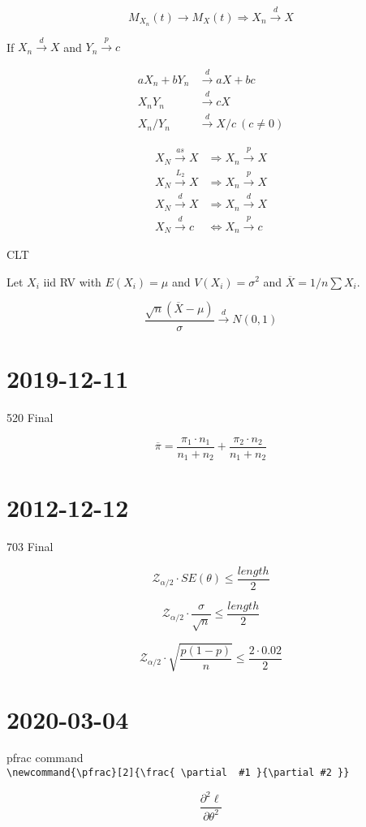 \documentclass[]{article}
\begin{document}
$$
M_{X_n}(t) \rightarrow M_X(t) \Rightarrow X_n \stackrel{d}{\rightarrow} X
$$



If $X_n \stackrel{d}{\rightarrow}X$ and $Y_n \stackrel{p}{\rightarrow}c$

\begin{align*}
aX_n + bY_n & \stackrel{d}{\rightarrow} aX + bc \\
X_n Y_n & \stackrel{d}{\rightarrow} cX \\
X_n / Y_n & \stackrel{d}{\rightarrow} X / c \ (c \neq 0)
\end{align*}



\begin{align*}
X_N \stackrel{as}{\rightarrow} X & \Rightarrow X_n \stackrel{p}{\rightarrow} X \\
X_N \stackrel{L_2}{\rightarrow} X & \Rightarrow X_n \stackrel{p}{\rightarrow} X \\
X_N \stackrel{d}{\rightarrow} X & \Rightarrow X_n \stackrel{d}{\rightarrow} X \\
X_N \stackrel{d}{\rightarrow}c & \Leftrightarrow X_n \stackrel{p}{\rightarrow} c
\end{align*}




CLT

\noindent
Let $X_i$ iid RV with $E(X_i) = \mu$ and $V(X_i) = \sigma^2$ and $\overline{ X } = 1/n \sum X_i$.

$$
\frac{ \sqrt{ n} (\overline{ X } - \mu) } { \sigma } \stackrel{d}{\rightarrow} N(0,1)
$$




\section*{2019-12-11}

520 Final

$$
\overline{ \pi } = \frac{ \pi_1 \cdot n_1 }{ n_1 + n_2 } + \frac{ \pi_2 \cdot n_2  }{ n_1 + n_2 }
$$


\section*{2012-12-12}

703 Final

$$
\mathcal{Z}_{\alpha/2} \cdot SE(\theta) \leq \frac{ length}{ 2 }
$$



$$
\mathcal{Z}_{\alpha/2} \cdot \frac{ \sigma }{ \sqrt{ {n} } } \leq \frac{ length}{ 2 }
$$


$$
\mathcal{Z}_{\alpha/2} \cdot \sqrt{ \frac{ p(1-p) }{ n }} \leq \frac{ 2\cdot 0.02 }{ 2 }
$$


\section*{2020-03-04}

pfrac command \\

\lstinline|\newcommand{\pfrac}[2]{\frac{ \partial  #1 }{\partial #2 }}|

\newcommand{\pfrac}[2]{\frac{ \partial  #1 }{\partial #2 }}

$$
\pfrac{^2 \ell}{ \theta^2}
$$
\end{document}
